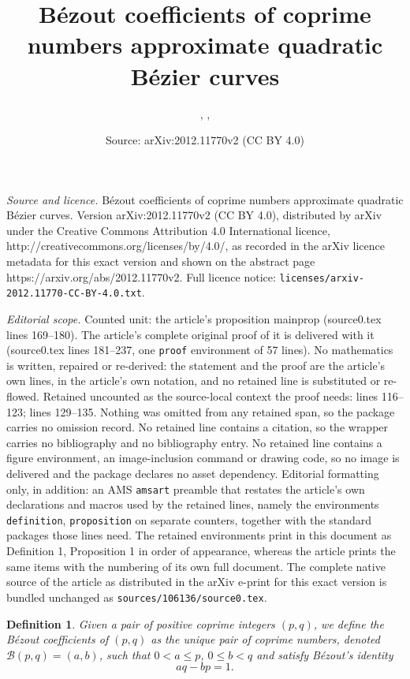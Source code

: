 \documentclass[10pt,a4paper]{amsart}
\title{B\'ezout coefficients of coprime numbers approximate quadratic B\'ezier curves}
\author{\sc{Benjam\'in A.~Itz\'a-Ortiz}, \sc{Roberto L\'opez-Hern\'andez}, \sc{Pedro Miramontes}}
\date{Source: arXiv:2012.11770v2 (CC BY 4.0)}
\newtheorem{definition}{Definition}
\begin{document}
\maketitle

\noindent\emph{Source and licence.} B\'ezout coefficients of coprime numbers approximate quadratic B\'ezier curves. Version arXiv:2012.11770v2 (CC BY 4.0), distributed by arXiv under the Creative Commons Attribution 4.0 International licence, http://creativecommons.org/licenses/by/4.0/, as recorded in the arXiv licence metadata for this exact version and shown on the abstract page https://arxiv.org/abs/2012.11770v2. Full licence notice: \texttt{licenses/arxiv-2012.11770-CC-BY-4.0.txt}.\par\smallskip

\noindent\textit{Editorial scope.} Counted unit: the article's proposition mainprop (source0.tex lines 169--180). The article's complete original proof of it is delivered with it (source0.tex lines 181--237, one \texttt{proof} environment of 57 lines). No mathematics is written, repaired or re-derived: the statement and the proof are the article's own lines, in the article's own notation, and no retained line is substituted or re-flowed.  Retained uncounted as the source-local context the proof needs: lines 116--123; lines 129--135.  Nothing was omitted from any retained span, so the package carries no omission record.  No retained line contains a citation, so the wrapper carries no bibliography and no bibliography entry.  No retained line contains a figure environment, an image-inclusion command or drawing code, so no image is delivered and the package declares no asset dependency.  Editorial formatting only, in addition: an AMS \texttt{amsart} preamble that restates the article's own declarations and macros used by the retained lines, namely the environments \texttt{definition}, \texttt{proposition} on separate counters, together with the standard packages those lines need.  The retained environments print in this document as Definition 1, Proposition 1 in order of appearance, whereas the article prints the same items with the numbering of its own full document.  The complete native source of the article as distributed in the arXiv e-print for this exact version is bundled unchanged as \texttt{sources/106136/source0.tex}.
\begin{definition}\label{defbezout}
Given a pair of positive coprime integers $(p,q)$, we define the {\em B\'ezout coefficients} of $(p,q)$ 
as the unique pair of coprime numbers, denoted $\mathcal B(p,q)=(a,b)$, such that $0<a \leq p$, $0\leq b < q$  and  satisfy  {B\'ezout's identity}
\begin{equation*}
    aq-bp=1.
\end{equation*}

 \end{definition}
\end{document}
